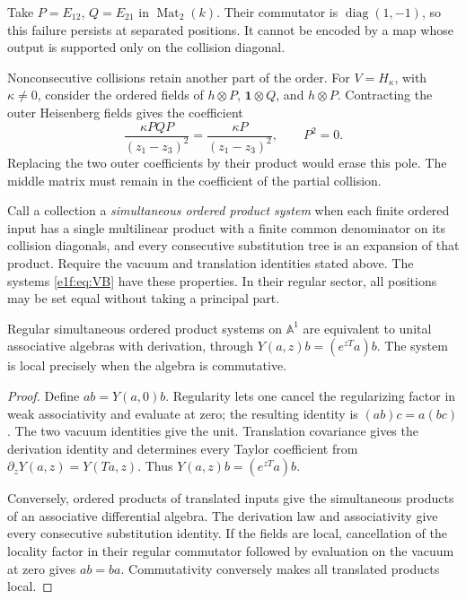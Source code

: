 Take \(P=E_{12}\), \(Q=E_{21}\) in \(\operatorname{Mat}_2(k)\).
Their commutator is \(\operatorname{diag}(1,-1)\), so this
failure persists at separated positions. It cannot be encoded
by a map whose output is supported only on the collision
diagonal.

Nonconsecutive collisions retain another part of the order.
For \(V=H_\kappa\), with \(\kappa\ne0\), consider the
ordered fields of \(h\otimes P\), \(\mathbf1\otimes Q\),
and \(h\otimes P\). Contracting the outer Heisenberg fields
gives the coefficient
\[
 \frac{\kappa PQP}{(z_1-z_3)^2}
       =\frac{\kappa P}{(z_1-z_3)^2},
 \qquad P^2=0.
\]
Replacing the two outer coefficients by their product would
erase this pole. The middle matrix must remain in the
coefficient of the partial collision.

Call a collection a \emph{simultaneous ordered product system}
when each finite ordered input has a single multilinear product
with a finite common denominator on its collision diagonals,
and every consecutive substitution tree is an expansion of
that product. Require the vacuum and translation identities
stated above. The systems \eqref{e1f:eq:VB} have these
properties. In their regular sector, all positions may be set
equal without taking a principal part.

\begin{proposition}\label{e1f:prop:regular}
Regular simultaneous ordered product systems on \(\mathbb A^1\)
are equivalent to unital associative algebras with derivation,
through \(Y(a,z)b=(e^{zT}a)b\). The system is local precisely
when the algebra is commutative.
\end{proposition}

\begin{proof}
Define \(ab=Y(a,0)b\). Regularity lets one cancel the
regularizing factor in weak associativity and evaluate at
zero; the resulting identity is \((ab)c=a(bc)\).
The two vacuum identities give the unit. Translation
covariance gives the derivation identity and determines every
Taylor coefficient from \(\partial_zY(a,z)=Y(Ta,z)\).
Thus \(Y(a,z)b=(e^{zT}a)b\).

Conversely, ordered products of translated inputs give the
simultaneous products of an associative differential algebra.
The derivation law and associativity give every consecutive
substitution identity. If the fields are local, cancellation
of the locality factor in their regular commutator followed
by evaluation on the vacuum at zero gives \(ab=ba\).
Commutativity conversely makes all translated products local.
\end{proof}

